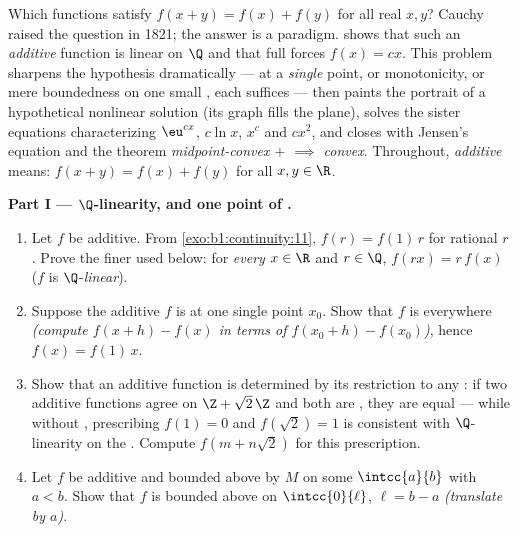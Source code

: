 \begin{problem}[{Weekend problem --- $f(x + y) = f(x) + f(y)$:
regularity forces linearity, and the portrait of the monsters}]
\label{pb:b1:continuity:1}
Which functions satisfy $f(x + y) = f(x) + f(y)$ for all real $x,
y$? Cauchy raised the question in 1821; the answer is a paradigm.
 shows that such an \emph{additive}
function is linear on $\Q$ and that full  forces $f(x)
= cx$. This problem sharpens the hypothesis dramatically ---
 at a \emph{single} point, or monotonicity, or mere
boundedness on one small , each suffices --- then paints
the portrait of a hypothetical nonlinear solution (its graph
fills the plane), solves the sister equations characterizing
$\eu^{cx}$, $c\ln x$, $x^c$ and $cx^2$, and closes with Jensen's
equation and the theorem \emph{midpoint-convex $+$ 
$\implies$ convex}. Throughout, \emph{additive}
means: $f(x + y) = f(x) + f(y)$ for all $x, y \in \R$.

\medskip
\noindent\textbf{Part I --- $\Q$-linearity, and one point of
.}
\begin{enumerate}
  \item Let $f$ be additive. From \cref{exo:b1:continuity:11},
        $f(r) = f(1)\,r$ for rational $r$. Prove the finer
         used below: for \emph{every} $x \in \R$ and $r
        \in \Q$, $f(rx) = r\,f(x)$ ($f$ is
        $\Q$-\emph{linear}).
  \item Suppose the additive $f$ is  at one single
        point $x_0$. Show that $f$ is  everywhere
        \emph{(compute $f(x + h) - f(x)$ in terms of $f(x_0 + h)
        - f(x_0)$)}, hence $f(x) = f(1)\,x$.
  \item Show that an additive function is determined by its
        restriction to any  : if two additive
        functions agree on $\Z + \sqrt2\,\Z$ and both are
        , they are equal --- while without ,
        prescribing $f(1) = 0$ and $f(\sqrt 2) = 1$ is consistent
        with $\Q$-linearity on the . Compute $f(m +
        n\sqrt2)$ for this prescription.
  \item Let $f$ be additive and bounded above by $M$ on some
         $\intcc{a}{b}$ with $a < b$. Show that $f$ is
        bounded above on $\intcc{0}{\ell}$, $\ell = b - a$
        \emph{(translate by $a$)}.
\end{enumerate}


\end{problem}
